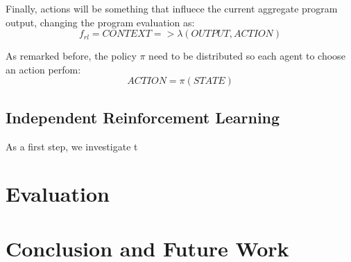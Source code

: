 \documentclass[
  twocolumn,
]{ceurart}
\begin{document}
Finally, actions will be something that influece the current aggregate program output, changing the program evaluation as:
$$
f_{rl} = CONTEXT => \lambda(OUTPUT, ACTION)
$$

As remarked before, the policy $\pi$ need to be distributed so each agent to choose an action perfom:
$$
ACTION = \pi(STATE)
$$

\subsection{Independent Reinforcement Learning}
As a first step, we investigate t
\section{Evaluation} %


\section{Conclusion and Future Work}
\nocite{*}


\appendix
\end{document}
